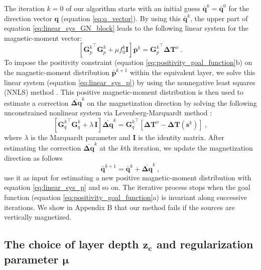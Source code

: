 The iteration $k = 0$ of our algorithm starts with an initial guess 
$\bar{\mathbf{q}}^{k} = \bar{\mathbf{q}}^{0}$ for the direction vector $\mathbf{q}$ 
(equation \ref{eq:q_vector}).
By using this $\bar{\mathbf{q}}^{k}$, the upper part of equation 
\ref{eq:linear_sys_GN_block} leads to the following linear system for the magnetic-moment 
vector:
\begin{equation}
\left[ {\mathbf{G}_{p}^{k}}^{\top} \mathbf{G}_{p}^{k} + 
\mu f_{0}^{k} \mathbf{I} \right] \bar{\mathbf{p}}^{k} = {\mathbf{G}_{p}^{k}}^{\top} \mathbf{\Delta T}^{o} \: .
\label{eq:linear_sys_p}
\end{equation}
To impose the positivity constraint (equation \ref{eq:positivity_goal_function}b) on the 
magnetic-moment distribution $\bar{\mathbf{p}}^{k+1}$ within the equivalent layer, 
we solve this linear system (equation \ref{eq:linear_sys_p}) by using the nonnegative least 
squares (NNLS) method \citep{lawson_hanson_1974, silvadias_etal_2007}.
This positive magnetic-moment distribution is then used to estimate a correction 
$\bar{\mathbf{\Delta q}}^{k}$ on the magnetization direction by solving the following 
unconstrained nonlinear system via Levenberg-Marquardt method \citep{aster2005}:
\begin{equation}
\left[ {\mathbf{G}_{q}^{k}}^{\top} \mathbf{G}_{q}^{k} + \lambda \, \mathbf{I} \right] 
\bar{\mathbf{\Delta q}}^{k} = {\mathbf{G}_{q}^{k}}^{\top} 
\left[ \mathbf{\Delta T}^{o} - \mathbf{\Delta T} (\mathbf{s}^{k}) \right] \: ,
\label{eq:linear_sys_q}
\end{equation}
where $\lambda$ is the Marquardt parameter and $\mathbf{I}$ is the identity matrix. 
After estimating the correction $\bar{\mathbf{\Delta q}}^{k}$ 
at the $k$th iteration, we update the magnetization direction as follows
\begin{equation}
\bar{\mathbf{q}}^{k+1} = \bar{\mathbf{q}}^{k} + \bar{\mathbf{\Delta q}}^{k} \: ,
\label{eq:q_next}
\end{equation}
use it as input for estimating a new positive magnetic-moment distribution 
with equation \ref{eq:linear_sys_p} and so on.
The iterative process stops when the goal function (equation \ref{eq:positivity_goal_function}a) 
is invariant along successive iterations. 
We show in Appendix B that our method fails if the sources are vertically magnetized.

\subsection{The choice of layer depth $\mathbf{z_{c}}$ and regularization parameter $\mathbf{\mu}$}

